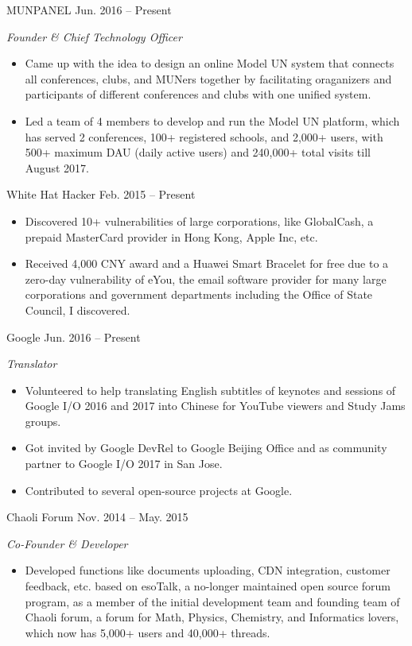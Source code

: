 \documentclass[hidelinks__VERSION__]{adamyi-cv} %
\begin{document}
\begin{entrylist}


\entry
{MUNPANEL}
{Jun. 2016 -- Present}
{\emph{Founder \& Chief Technology Officer}
\begin{itemize}
\item Came up with the idea to design an online Model UN system that connects all conferences, clubs, and MUNers together by facilitating oraganizers and participants of different conferences and clubs with one unified system.
\item Led a team of 4 members to develop and run the Model UN platform, which has served 2 conferences, 100+ registered schools, and 2,000+ users, with 500+ maximum DAU (daily active users) and 240,000+ total visits till August 2017.
\end{itemize}}


\entry
{White Hat Hacker}
{Feb. 2015 -- Present}
{\begin{itemize}
\item Discovered 10+ vulnerabilities of large corporations, like GlobalCash, a prepaid MasterCard provider in Hong Kong, Apple Inc, etc.
\item Received 4,000 CNY award and a Huawei Smart Bracelet for free due to a zero-day vulnerability of eYou, the email software provider for many large corporations and government departments including the Office of State Council, I discovered.
\end{itemize}}


\entry
{Google}
{Jun. 2016 -- Present}
{\emph{Translator}
\begin{itemize}
\item Volunteered to help translating English subtitles of keynotes and sessions of Google I/O 2016 and 2017 into Chinese for YouTube viewers and Study Jams groups.
\item Got invited by Google DevRel to Google Beijing Office and as community partner to Google I/O 2017 in San Jose.
\item Contributed to several open-source projects at Google.
\end{itemize}}


\entry
{Chaoli Forum}
{Nov. 2014 -- May. 2015}
{\emph{Co-Founder \& Developer}
\begin{itemize}
\item Developed functions like documents uploading, CDN integration, customer feedback, etc. based on esoTalk, a no-longer maintained open source forum program, as a member of the initial development team and founding team of Chaoli forum, a forum for Math, Physics, Chemistry, and Informatics lovers, which now has 5,000+ users and 40,000+ threads.
\end{itemize}}


\end{entrylist}
\end{document}
